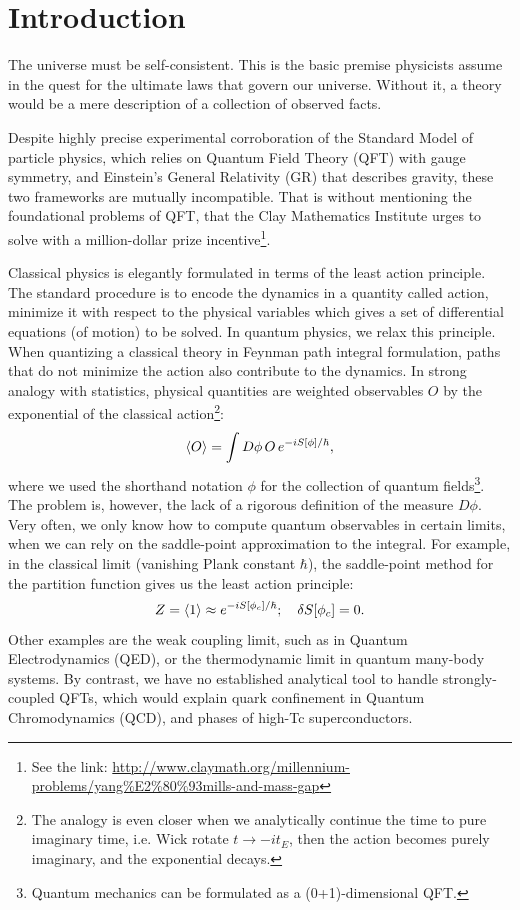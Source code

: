 \chapter{Introduction}


The universe must be self-consistent. This is the basic premise physicists assume in the quest for the ultimate laws that govern our universe. Without it, a theory would be a mere description of a collection of observed facts. 

Despite highly precise experimental corroboration of the Standard Model of particle physics, which relies on Quantum Field Theory (QFT) with gauge symmetry, and Einstein's General Relativity (GR) that describes gravity, these two frameworks are mutually incompatible. That is without mentioning the foundational problems of QFT, that the Clay Mathematics Institute urges to solve with a million-dollar prize incentive\footnote{
See the link: \url{http://www.claymath.org/millennium-problems/yang\%E2\%80\%93mills-and-mass-gap} 
}.

Classical physics is elegantly formulated in terms of the least action principle. 
The standard procedure is to encode the dynamics in a quantity called action, 
minimize it with respect to the physical variables which gives a set of differential equations (of motion) to be solved. 
In quantum physics, we relax this principle. When quantizing a classical theory in Feynman path integral formulation, 
paths that do not minimize the action also contribute to the dynamics. In strong analogy with statistics, 
physical quantities are weighted observables $O$ by the exponential of the classical action\footnote{
The analogy is even closer when we analytically continue the time to pure imaginary time, i.e. Wick rotate $t \rightarrow -i t_{E}$, 
then the action becomes purely imaginary, and the exponential decays.}:
\[
 \braket{O} = \int D\phi \, O\, e^{-i S[\phi]/\hbar},
\]
where we used the shorthand notation $\phi$ for the collection of quantum fields\footnote{
Quantum mechanics can be formulated as a (0+1)-dimensional QFT.}. 
The problem is, however, the lack of a rigorous definition of the measure $D\phi$.
Very often, we only know how to compute quantum observables in certain limits, 
when we can rely on the saddle-point approximation to the integral. 
For example, in the classical limit (vanishing Plank constant $\hbar$), 
the saddle-point method for the partition function gives us the least action principle:
\[
 Z=\braket{1} \approx e^{-i S[\phi_c]/\hbar}; \quad  \delta S[\phi_c] = 0 .
\]
Other examples are the weak coupling limit, such as in Quantum Electrodynamics (QED), 
or the thermodynamic limit in quantum many-body systems. 
By contrast, we have no established analytical tool to handle strongly-coupled QFTs, 
which would explain quark confinement in Quantum Chromodynamics (QCD), and phases of high-Tc superconductors.

